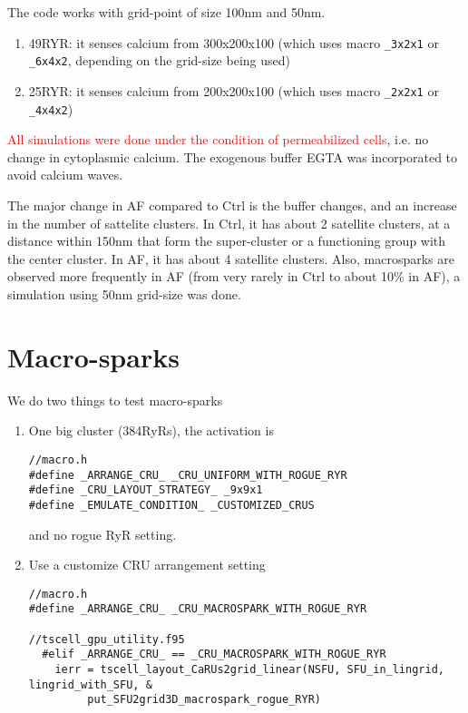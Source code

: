 The code works with grid-point of size 100nm and 50nm. 
\begin{enumerate}
  \item 49RYR: it senses calcium from 300x200x100 (which uses macro
  \verb!_3x2x1! or \verb!_6x4x2!, depending on the grid-size being used)
  \item 25RYR: it senses calcium from 200x200x100 (which uses macro
  \verb!_2x2x1! or \verb!_4x4x2!)
\end{enumerate}

\textcolor{red}{All simulations were done under the condition of permeabilized
cells}, i.e. no change in cytoplasmic calcium. The exogenous buffer EGTA was
incorporated to avoid calcium waves.

The major change in AF compared to Ctrl is the buffer changes, and an increase
in the number of sattelite clusters. In Ctrl, it has about 2 satellite clusters,
at a distance within 150nm that form the super-cluster or a functioning group
with the center cluster. In AF, it has about 4 satellite clusters. Also,
macrosparks are observed more frequently in AF (from very rarely in Ctrl to
about 10\% in AF), a simulation using 50nm grid-size was done. 


\section{Macro-sparks}

We do two things to test macro-sparks

\begin{enumerate}
  \item One big cluster (384RyRs), the activation is 
\begin{verbatim}
//macro.h
#define _ARRANGE_CRU_ _CRU_UNIFORM_WITH_ROGUE_RYR
#define _CRU_LAYOUT_STRATEGY_ _9x9x1
#define _EMULATE_CONDITION_ _CUSTOMIZED_CRUS
\end{verbatim}  
and no rogue RyR setting.

  \item Use a customize CRU arrangement setting  
\begin{verbatim}
//macro.h
#define _ARRANGE_CRU_ _CRU_MACROSPARK_WITH_ROGUE_RYR

//tscell_gpu_utility.f95
  #elif _ARRANGE_CRU_ == _CRU_MACROSPARK_WITH_ROGUE_RYR
    ierr = tscell_layout_CaRUs2grid_linear(NSFU, SFU_in_lingrid, lingrid_with_SFU, &
         put_SFU2grid3D_macrospark_rogue_RYR)

\end{verbatim}
\end{enumerate}


